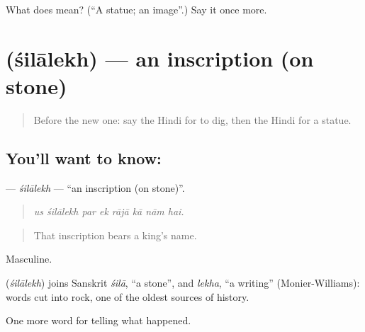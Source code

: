 \begin{tcolorbox}[breakable,colback=teal!4,colframe=teal!35!black,title={Before you move on}]
What does  mean? (\textquotedblleft{}A statue; an image\textquotedblright{}.) Say it once more.
\end{tcolorbox}
\section[\texorpdfstring{\hi{शिलालेख} (śilālekh)}{शिलालेख (śilālekh)}]{ (śilālekh) — an inscription (on stone)}

\label{lesson:HI-C326-silalekh}



\begin{quote}
Before the new one: say the Hindi for to dig, then the Hindi for a statue.
\end{quote}

\subsection*{You'll want to know: }
\textbf{} — \emph{śilālekh} — \textquotedblleft{}an inscription (on stone)\textquotedblright{}.

\begin{quote}
       
\end{quote}

\begin{quote}
\emph{us śilālekh par ek rājā kā nām hai.}
\end{quote}

\begin{quote}
That inscription bears a king's name.
\end{quote}

Masculine.

\begin{cousinweb}
\textbf{} (\emph{śilālekh}) joins Sanskrit \emph{śilā}, \textquotedblleft{}a stone\textquotedblright{}, and \emph{lekha}, \textquotedblleft{}a writing\textquotedblright{} (Monier-Williams): words cut into rock, one of the oldest sources of history.
\end{cousinweb}

\begin{grammarlens}[title={What you've built}]
One more word for telling what happened.
\end{grammarlens}

